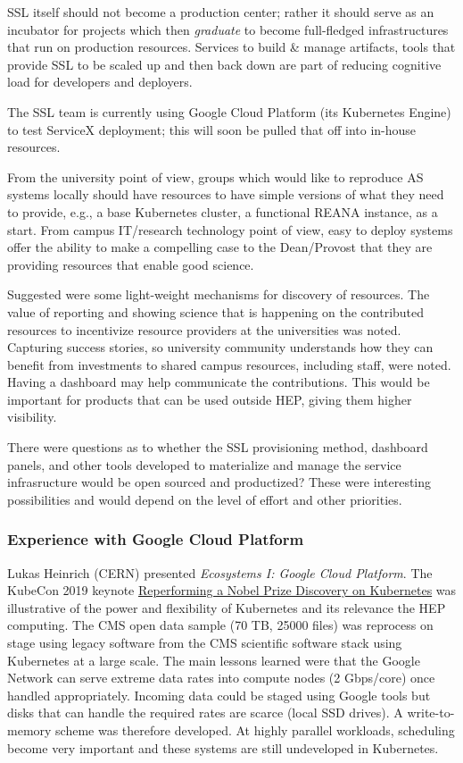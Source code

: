 \documentclass[11pt,letterpaper,fleqn]{article}
\begin{document}
SSL itself should not become a production center; rather it should serve as an incubator for projects which then {\it graduate} to become full-fledged infrastructures that run on production resources. Services to build \& manage artifacts, tools that provide SSL to be scaled up and then back down are part of reducing cognitive load for developers and deployers.

The SSL team is currently using Google Cloud Platform (its Kubernetes Engine) to test ServiceX deployment; this will soon be pulled that off into in-house resources.

From the university point of view, groups which would like to reproduce AS systems locally should have resources to have simple versions of what they need to provide, e.g., a base Kubernetes cluster, a functional REANA instance, as a start.  From campus IT/research technology point of view, easy to deploy systems offer the ability to make a compelling case to the Dean/Provost that they are providing resources that enable good science.


Suggested were some light-weight mechanisms for discovery of resources.   The value of reporting and showing science that is happening on the contributed resources to incentivize resource providers at the universities was noted.  Capturing success stories, so university community understands how they can benefit from investments to shared campus resources, including staff, were noted.  Having a dashboard may help communicate the contributions.  This would be important for products that can be used outside HEP, giving them higher visibility.

There were questions as to whether the SSL provisioning method, dashboard panels, and other tools developed to materialize and manage the service infrasructure would be open sourced and productized?  These were interesting possibilities and would depend on the level of effort and other priorities.

\subsubsection{Experience with Google Cloud Platform}
\vspace{0.2cm}
Lukas Heinrich (CERN) presented {\it Ecosystems I: Google Cloud Platform}.  The KubeCon 2019 keynote \href{https://sched.co/MRyv}{Reperforming a Nobel Prize Discovery on Kubernetes} was illustrative of the power and flexibility of Kubernetes and its relevance the HEP computing.  The CMS open data sample (70 TB, 25000 files) was reprocess on stage using legacy software from the CMS scientific software stack using Kubernetes at a large scale.  The main lessons learned were that the Google Network can serve extreme data rates into compute nodes (2 Gbps/core) once handled appropriately. Incoming data could be staged using Google tools but disks that can handle the required rates are scarce (local SSD drives).  A write-to-memory scheme was therefore developed. At highly parallel workloads, scheduling become very important and these systems are still undeveloped in Kubernetes.
\end{document}
